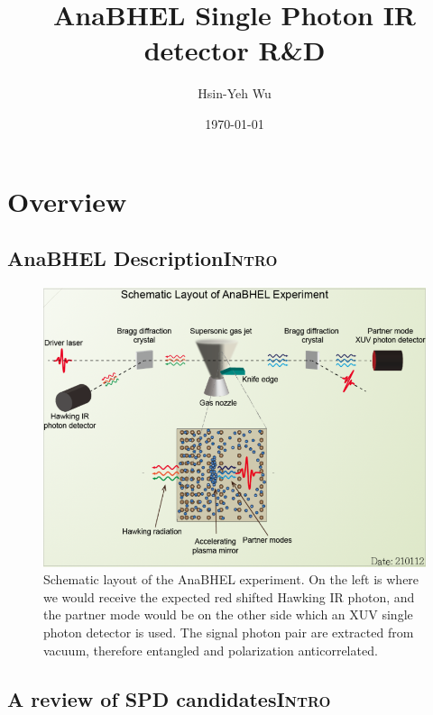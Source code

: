 \documentclass[11pt]{article}
\author{Hsin-Yeh Wu}
\date{\today}
\title{AnaBHEL Single Photon IR detector R\&D}
\begin{document}
\maketitle
\setcounter{tocdepth}{5}
\tableofcontents


\section*{Overview}
\label{sec:org811364a}

\subsection*{AnaBHEL Description\hfill{}\textsc{Intro}}
\label{sec:orgf61c956}

\begin{figure}[htbp]
\centering
\includegraphics[width=.9\linewidth]{Overview/2021-07-07_19-08-46_2021-07-07_18-49-02_2021-07-07_18-48-24_Screen Shot 2021-07-07 at 6.48.18 PM.png}
\caption{Schematic layout of the AnaBHEL experiment. On the left is where we would receive the expected red shifted Hawking IR photon, and the partner mode would be on the other side which an XUV single photon detector is used. The signal photon pair are extracted from vacuum, therefore entangled and polarization anticorrelated.}
\end{figure}

\subsection*{A review of SPD candidates\hfill{}\textsc{Intro}}
\label{sec:orgf369e68}

\cite{morozov18_super_confer_presen}
\end{document}
